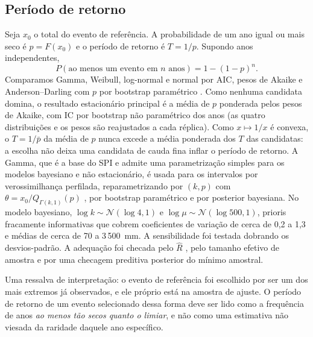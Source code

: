 \documentclass[11pt,a4paper]{article}
\begin{document}
\subsection{Período de retorno}
Seja $x_0$ o total do evento de referência. A probabilidade de um ano igual ou mais seco é
$p = F(x_0)$ e o período de retorno é $T=1/p$. Supondo anos independentes,
\begin{equation}
  P(\text{ao menos um evento em } n \text{ anos}) = 1 - (1-p)^n. \label{eq:pn}
\end{equation}
Comparamos Gamma, Weibull, log-normal e normal por AIC, pesos de Akaike
\parencite{burnham2002} e Anderson--Darling com $p$ por bootstrap paramétrico
\parencite{anderson1954}. Como nenhuma candidata domina, o resultado estacionário principal é a
média de $p$ ponderada pelos pesos de Akaike, com IC por bootstrap não paramétrico dos anos (as
quatro distribuições e os pesos são reajustados a cada réplica). Como $x \mapsto 1/x$ é convexa, o
$T = 1/\bar p$ da média de $p$ nunca excede a média ponderada dos $T$ das candidatas: a escolha não
deixa uma candidata de cauda fina inflar o período de retorno. A Gamma, que é a base do SPI e
admite uma parametrização simples para os modelos bayesiano e não estacionário, é usada para os
intervalos por verossimilhança perfilada, reparametrizando por $(k, p)$ com
$\theta = x_0/Q_{\Gamma(k,1)}(p)$ \parencite{coles2001}, por bootstrap paramétrico e por
posterior bayesiana. No modelo bayesiano, $\log k \sim \mathcal N(\log 4, 1)$ e
$\log\mu \sim \mathcal N(\log 500, 1)$, prioris fracamente informativas que cobrem coeficientes
de variação de cerca de 0,2 a 1,3 e médias de cerca de 70 a 3\,500~mm. A sensibilidade foi
testada dobrando os desvios-padrão. A adequação foi checada pelo $\hat R$ \parencite{gelman1992},
pelo tamanho efetivo de amostra e por uma checagem preditiva posterior do mínimo amostral.

Uma ressalva de interpretação: o evento de referência foi escolhido por ser um dos mais extremos
já observados, e ele próprio está na amostra de ajuste. O período de retorno de um evento
selecionado dessa forma deve ser lido como a frequência de anos \emph{ao menos tão secos quanto
o limiar}, e não como uma estimativa não viesada da raridade daquele ano específico.
\end{document}
